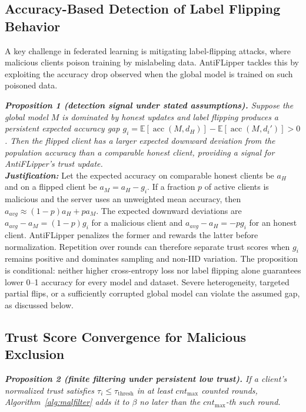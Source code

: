 \documentclass[conference]{IEEEtran}
\begin{document}
\subsection{Accuracy-Based Detection of Label Flipping Behavior} A key challenge in federated learning is mitigating label-flipping attacks, where malicious clients poison training by mislabeling data. AntiFLipper tackles this by exploiting the accuracy drop observed when the global model is trained on such poisoned data.

\textit{\textbf{Proposition 1 (detection signal under stated assumptions).} Suppose the global model \(M\) is dominated by honest updates and label flipping produces a persistent expected accuracy gap \(g_i=\mathbb{E}[\operatorname{acc}(M,d_H)]-\mathbb{E}[\operatorname{acc}(M,d_i')]>0\). Then the flipped client has a larger expected downward deviation from the population accuracy than a comparable honest client, providing a signal for AntiFLipper's trust update.} \\

\textit{\textbf{Justification:}} Let the expected accuracy on comparable honest clients be $a_H$ and on a flipped client be $a_M=a_H-g_i$. If a fraction $p$ of active clients is malicious and the server uses an unweighted mean accuracy, then $a_{avg}\approx(1-p)a_H+pa_M$. The expected downward deviations are $a_{avg}-a_M=(1-p)g_i$ for a malicious client and $a_{avg}-a_H=-pg_i$ for an honest client. AntiFLipper penalizes the former and rewards the latter before normalization. Repetition over rounds can therefore separate trust scores when $g_i$ remains positive and dominates sampling and non-IID variation. The proposition is conditional: neither higher cross-entropy loss nor label flipping alone guarantees lower 0--1 accuracy for every model and dataset. Severe heterogeneity, targeted partial flips, or a sufficiently corrupted global model can violate the assumed gap, as discussed below.

\subsection{Trust Score Convergence for Malicious Exclusion}
\textit{\textbf{Proposition 2 (finite filtering under persistent low trust).} If a client's normalized trust satisfies \(\tau_i\leq\tau_{\text{thresh}}\) in at least $cnt_{\max}$ counted rounds, Algorithm~\ref{alg:malfilter} adds it to $\beta$ no later than the $cnt_{\max}$-th such round.} \\
\end{document}
